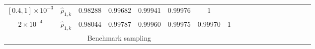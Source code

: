 \begin{table}[ht]
{\begin{tabular}{|c|c|c|c|c|c|c|c|c|c|c|c|c|c|c|c|c|c|c|}
\hline
\multirow{1}{*}{$[0.4, 1]\times 10^{-3}$}&\multicolumn{1}{|c|}{$\widehat \rho_{1,k}$}&0.98288 &0.99682 &0.99941 &0.99976&1&\\
\cline{2-8}	
\multirow{1}{*}{$2\times 10^{-4}$}&\multicolumn{1}{|c|}{$\widehat \rho_{1,k}$}&0.98044&0.99787&0.99960&0.99975&0.99970   &1\\
\hline
\multicolumn{8}{|c|}{Benchmark sampling} \\
\hline

\end{tabular}}
\end{table}
